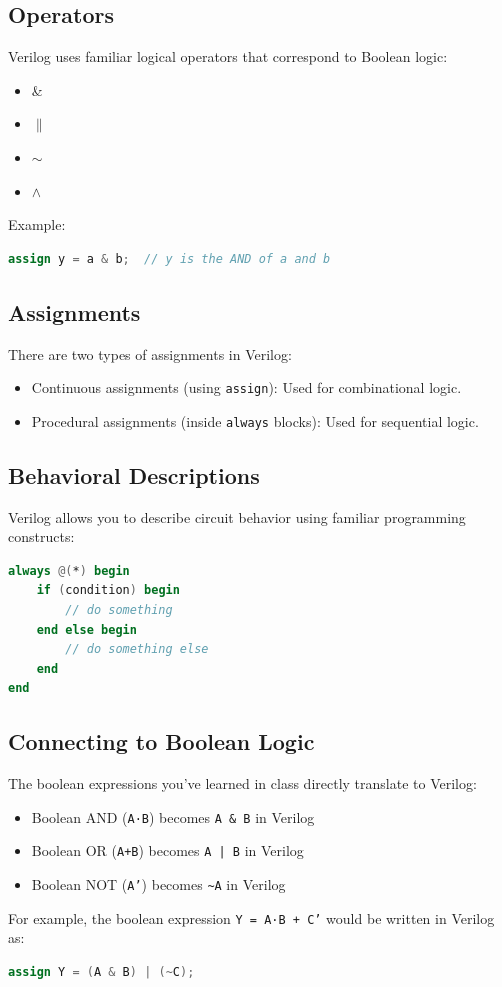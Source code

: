\documentclass[12pt]{journal}
\begin{document}
\subsection{Operators}

Verilog uses familiar logical operators that correspond to Boolean logic:

\begin{itemize}
  \item {} \& 
  \item {} $\|$
  \item {} $\sim $
  \item {} $\wedge$
\end{itemize}

Example: \begin{lstlisting}[language=verilog]
assign y = a & b;  // y is the AND of a and b
\end{lstlisting}


\subsection{Assignments}
There are two types of assignments in Verilog:
\begin{itemize}
  \item Continuous assignments (using \texttt{assign}): Used for combinational logic.
  \item Procedural assignments (inside \texttt{always} blocks): Used for sequential logic.
\end{itemize}

\subsection{Behavioral Descriptions}
Verilog allows you to describe circuit behavior using familiar programming constructs:
\begin{lstlisting}[language=verilog]    
always @(*) begin
    if (condition) begin
        // do something
    end else begin
        // do something else
    end
end
\end{lstlisting}

\subsection{Connecting to Boolean Logic}
The boolean expressions you've learned in class directly translate to Verilog:
\begin{itemize}
  \item Boolean AND (\texttt{A·B}) becomes \texttt{A \& B} in Verilog
  \item Boolean OR (\texttt{A+B}) becomes \texttt{A | B} in Verilog
  \item Boolean NOT (\texttt{A'}) becomes \texttt{\textasciitilde A} in Verilog
\end{itemize}
For example, the boolean expression \texttt{Y = A·B + C'} would be written in Verilog as:
\begin{lstlisting}[language=verilog]
assign Y = (A & B) | (~C);
\end{lstlisting}
\end{document}
